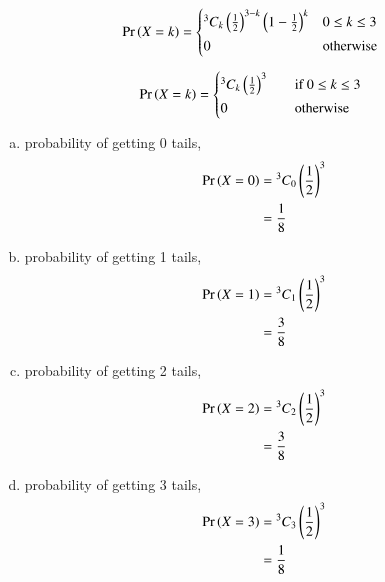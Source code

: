 \documentclass[journal,12pt,twocolumn]{IEEEtran}
\begin{document}
\begin{enumerate}[(i)]
\begin{align*}
   \pr{X=k} =
  \begin{cases*}
    {^3 C_k}\brak{\frac{1}{2}}^{3-k}\brak{1-\frac{1}{2}}^{k} & $0 \leq k \leq 3$\\
    0 & otherwise
  \end{cases*}
\end{align*}

\begin{align}
   \pr{X=k} =
  \begin{cases*}
    {^3 C_k}\brak{\frac{1}{2}}^{3} \quad& if $0 \leq k \leq 3$ \\
    0 \quad& otherwise
  \end{cases*}
\end{align}

\begin{enumerate}[(a)]
\item probability of getting 0 tails,
    \begin{align}
        \begin{split}
            \Pr\left(X=0\right) &= {^3C_0}\left(\frac{1}{2}\right)^3\\
            &=\frac{1}{8}
        \end{split}
    \end{align}

\item probability of getting 1 tails,
    \begin{align}
        \begin{split}
            \Pr\left(X=1\right) &= {^3C_1}\left(\frac{1}{2}\right)^3\\
            &=\frac{3}{8}
        \end{split}
    \end{align}

\item probability of getting 2 tails,
    \begin{align}
        \begin{split}
            \Pr\left(X=2\right) &= {^3C_2}\left(\frac{1}{2}\right)^3\\
            &=\frac{3}{8}
        \end{split}
    \end{align}

\item probability of getting 3 tails,
    \begin{align}
        \begin{split}
            \Pr\left(X=3\right) &= {^3C_3}\left(\frac{1}{2}\right)^3\\
            &=\frac{1}{8}
        \end{split}
    \end{align}
\end{enumerate}


\end{enumerate}
\end{document}
